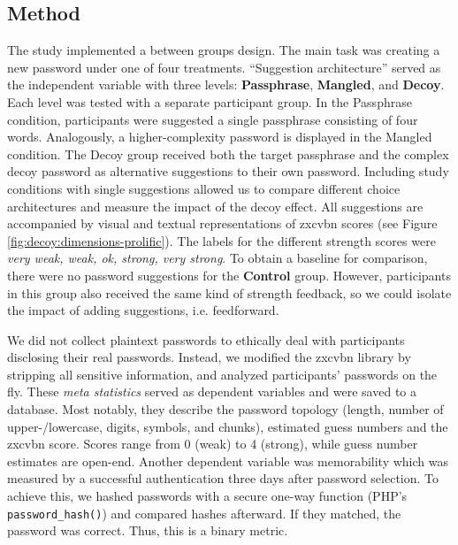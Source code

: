 \subsection{Method}
The study implemented a between groups design. The main task was creating a new password under one of four treatments. ``Suggestion architecture'' served as the independent variable with three levels: \textbf{Passphrase}, \textbf{Mangled}, and \textbf{Decoy}. Each level was tested with a separate participant group. In the Passphrase condition, participants were suggested a single passphrase consisting of four words. Analogously, a higher-complexity password is displayed in the Mangled condition. The Decoy group received both the target passphrase and the complex decoy password as alternative suggestions to their own password. Including study conditions with single suggestions allowed us to compare different choice architectures and measure the impact of the decoy effect. All suggestions are accompanied by visual and textual representations of zxcvbn scores (see Figure \ref{fig:decoy:dimensions-prolific}). The labels for the different strength scores were \textit{very weak, weak, ok, strong, very strong}. To obtain a baseline for comparison, there were no password suggestions for the \textbf{Control} group. However, participants in this group also received the same kind of strength feedback, so we could isolate the impact of adding suggestions, i.e. feedforward. 

We did not collect plaintext passwords to ethically deal with participants disclosing their real passwords. Instead, we modified the zxcvbn library by stripping all sensitive information, and analyzed participants' passwords on the fly. These \textit{meta statistics} served as dependent variables and were saved to a database. Most notably, they describe the password topology (length, number of upper-/lowercase, digits, symbols, and chunks), estimated guess numbers and the zxcvbn score. Scores range from 0 (weak) to 4 (strong), while guess number estimates are open-end. Another dependent variable was memorability which was measured by a successful authentication three days after password selection. To achieve this, we hashed passwords with a secure one-way function (PHP's \texttt{password\_hash()}) and compared hashes afterward. If they matched, the password was correct. Thus, this is a binary metric.

